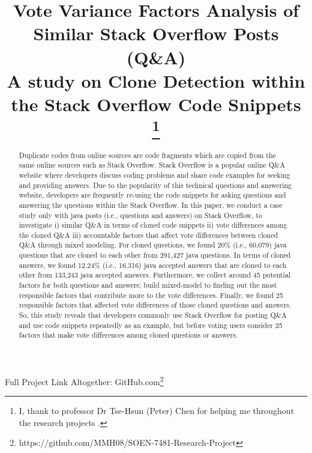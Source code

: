 \documentclass[conference]{IEEEtran}
\begin{document}
	
	\title{Vote Variance Factors Analysis of Similar Stack Overflow Posts (Q\&A) \\
		{\footnotesize \textsuperscript{}A study on Clone Detection within the Stack Overflow Code Snippets}
		\thanks{I, thank to professor Dr Tse-Hsun (Peter) Chen for helping me throughout the research projects .}
	}
	
	\author{
	}
	
	\maketitle
	Full Project Link Altogether: GitHub.com\footnote{ https://github.com/MMH08/SOEN-7481-Research-Project} \newline
	
	\begin{abstract}
		Duplicate codes from online sources are code fragments which are copied from the same online sources such as Stack Overflow. Stack Overflow is a popular online Q\&A website where developers discuss coding problems and share code examples for seeking and providing answers. Due to the popularity of this technical questions and answering website, developers are frequently re-using the code snippets for asking questions and answering the questions within the Stack Overflow. In this paper, we conduct a case study only with java posts (i.e., questions and answers) on Stack Overflow, to investigate i) similar Q\&A in terms of cloned code snippets ii) vote differences among the cloned Q\&A iii) accountable factors that affect vote differences between cloned Q\&A through mixed modeling. For cloned questions, we found 20\% (i.e., 60,079) java questions that are cloned to each other from 291,427 java questions. In terms of cloned answers, we found 12.24\% (i.e., 16,316) java accepted answers that are cloned to each other from 133,243 java accepted answers. Furthermore, we collect around 45 potential factors for both questions and answers; build mixed-model to finding out the most responsible factors that contribute more to the vote differences. Finally, we found 25 responsible factors that affected vote differences of those cloned questions and answers. So, this study reveals that developers commonly use Stack Overflow for posting Q\&A and use code snippets repeatedly as an example, but before voting users consider 25 factors that make vote differences among cloned questions or answers. 
		
	\end{abstract}
	
\end{document}
